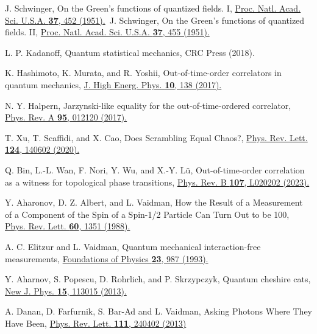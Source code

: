 \documentclass[twocolumn,pra,aps,superscriptaddress]{revtex4-2}
\begin{document}
\begin{thebibliography}{99}

 J. Schwinger, On the Green's functions of quantized fields. I, \href{https://www.pnas.org/doi/10.1073/pnas.37.7.452}{Proc. Natl. Acad. Sci. U.S.A. \textbf{37}, 452 (1951).}~J. Schwinger, On the Green's functions of quantized fields. II, \href{https:// www.pnas.org/doi/abs/10.1073/pnas.37.7.455}{Proc. Natl. Acad. Sci. U.S.A. \textbf{37}, 455 (1951).}

 L. P. Kadanoff, Quantum statistical mechanics, CRC Press (2018).

 K. Hashimoto, K. Murata, and R. Yoshii, Out-of-time-order correlators in quantum mechanics, \href{https://doi.org/10.1007/JHEP10(2017)138}{J. High Energ. Phys. \textbf{10}, 138 (2017).}

 N. Y. Halpern, Jarzynski-like equality for the out-of-time-ordered correlator, \href{https://journals.aps.org/pra/abstract/10.1103/PhysRevA.95.012120}{Phys. Rev. A \textbf{95}, 012120 (2017).}

 T. Xu, T. Scaffidi, and X. Cao, Does Scrambling Equal Chaos?, \href{https://journals.aps.org/prl/abstract/10.1103/PhysRevLett.124.140602}{Phys. Rev. Lett. \textbf{124}, 140602 (2020).}

 Q. Bin, L.-L. Wan, F. Nori, Y. Wu, and X.-Y. L\"u, Out-of-time-order correlation as a witness for topological phase transitions, \href{https://journals.aps.org/prb/abstract/10.1103/PhysRevB.107.L020202}{Phys. Rev. B \textbf{107}, L020202 (2023).}

 Y. Aharonov, D. Z. Albert, and L. Vaidman, How the Result of a Measurement of a Component of the Spin of a
Spin-1/2 Particle Can Turn Out to be 100, \href{https://journals.aps.org/prl/abstract/10.1103/PhysRevLett.60.1351}{Phys. Rev. Lett. \textbf{60}, 1351 (1988).}

 A. C. Elitzur and L. Vaidman, Quantum mechanical interaction-free measurements, \href{https://link.springer.com/article/10.1007/BF00736012}{Foundations of Physics \textbf{23}, 987 (1993).}

 Y. Aharnov, S. Popescu, D. Rohrlich, and P. Skrzypczyk, Quantum cheshire cats, \href{https://iopscience.iop.org/article/10.1088/1367-2630/15/11/113015}{New J. Phys. \textbf{15}, 113015 (2013).}

 A. Danan, D. Farfurnik, S. Bar-Ad and L. Vaidman, Asking Photons Where They Have Been, \href{https://journals.aps.org/prl/abstract/10.1103/PhysRevLett.111.240402}{Phys. Rev. Lett. \textbf{111}, 240402 (2013)}


\end{thebibliography}
\end{document}
